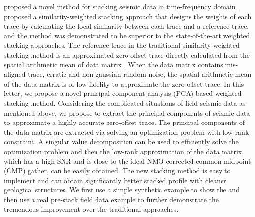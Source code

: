  \cite{stackgrsl2014} proposed a novel method for stacking seismic data in time-frequency domain \cite{liuwei2016ewt,hongbo2015}. %
 \cite{Liu09} proposed a similarity-weighted stacking approach that designs the weights of each trace by calculating the local similarity between each trace and a reference trace, and the method was demonstrated to be superior to the state-of-the-art weighted stacking approaches. %
The reference trace in the traditional similarity-weighted stacking method is an approximated zero-offset trace directly calculated from the spatial arithmetic mean of data matrix \cite{ron2010}. When the data matrix contains mis-aligned trace, erratic and non-gaussian random noise, the spatial arithmetic mean of the data matrix is of low fidelity to approximate the zero-offset trace. In this letter, we propose a novel principal component analysis (PCA) \cite{farrell2005,duqian2007} based weighted stacking method. Considering the complicated situations of field seismic data as mentioned above, we propose to extract the principal components of seismic data to approximate a highly accurate zero-offset trace. The principal components of the data matrix are extracted via solving an optimization problem with low-rank constraint. A singular value decomposition can be used to efficiently solve the optimization problem and then the low-rank approximation of the data matrix, which has a high SNR and is close to the ideal NMO-corrected common midpoint (CMP) gather, can be easily obtained. The new stacking method is easy to implement and can obtain significantly better stacked profile with cleaner geological structures. %
We first use a simple synthetic example to show the  and then use a real pre-stack field data example to further demonstrate the tremendous improvement over the traditional approaches.



